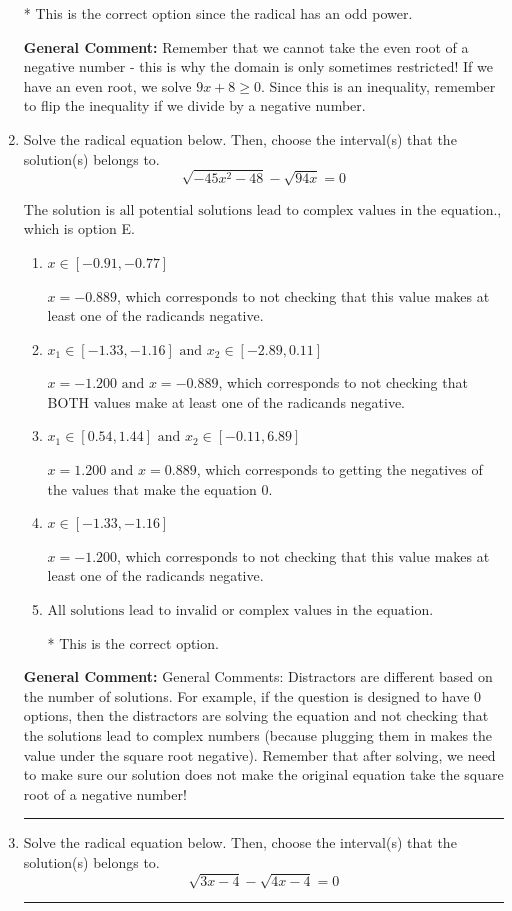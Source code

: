 \documentclass{extbook}[14pt]
\newcommand{\litem}[1]{\item #1

\rule{\textwidth}{0.4pt}}
\begin{document}
\begin{enumerate}
{\begin{enumerate}[label=\Alph*.]
* This is the correct option since the radical has an odd power.
\end{enumerate}

\textbf{General Comment:} Remember that we cannot take the even root of a negative number - this is why the domain is only sometimes restricted! If we have an even root, we solve $9 x + 8 \geq 0$. Since this is an inequality, remember to flip the inequality if we divide by a negative number.
}
\litem{
Solve the radical equation below. Then, choose the interval(s) that the solution(s) belongs to.
\[ \sqrt{-45 x^2 - 48} - \sqrt{94 x} = 0 \]

The solution is \( \text{all potential solutions lead to complex values in the equation.} \), which is option E.\begin{enumerate}[label=\Alph*.]
\item \( x \in [-0.91,-0.77] \)

$x = -0.889$, which corresponds to not checking that this value makes at least one of the radicands negative.
\item \( x_1 \in [-1.33, -1.16] \text{ and } x_2 \in [-2.89,0.11] \)

$x = -1.200 \text{ and } x = -0.889$, which corresponds to not checking that BOTH values make at least one of the radicands negative.
\item \( x_1 \in [0.54, 1.44] \text{ and } x_2 \in [-0.11,6.89] \)

$x = 1.200 \text{ and } x = 0.889$, which corresponds to getting the negatives of the values that make the equation 0.
\item \( x \in [-1.33,-1.16] \)

$x = -1.200$, which corresponds to not checking that this value makes at least one of the radicands negative.
\item \( \text{All solutions lead to invalid or complex values in the equation.} \)

* This is the correct option.
\end{enumerate}

\textbf{General Comment:} General Comments: Distractors are different based on the number of solutions. For example, if the question is designed to have 0 options, then the distractors are solving the equation and not checking that the solutions lead to complex numbers (because plugging them in makes the value under the square root negative). Remember that after solving, we need to make sure our solution does not make the original equation take the square root of a negative number!
}
\litem{
Solve the radical equation below. Then, choose the interval(s) that the solution(s) belongs to.
\[ \sqrt{3 x - 4} - \sqrt{4 x - 4} = 0 \]

}
\end{enumerate}
\end{document}
